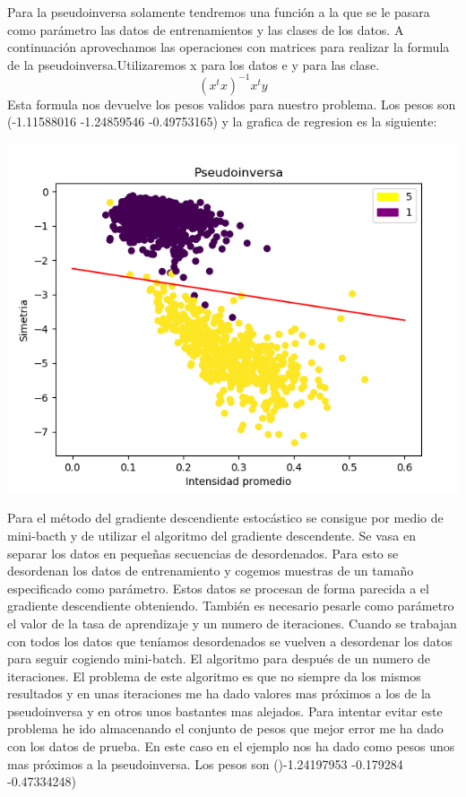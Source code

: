 \documentclass[titlepage]{article}
\begin{document}
	\normalfont
	\vspace{0.5cm}
	
	 Para la pseudoinversa solamente tendremos una función a la que se le pasara como parámetro las datos de entrenamientos y las clases de los datos. A continuación aprovechamos las operaciones con matrices para realizar la formula de la pseudoinversa.Utilizaremos x para los datos e y para las clase.
	 \begin{equation}
	  (x^tx)^{-1}x^ty
	 \end{equation}
	 Esta formula nos devuelve los pesos validos para nuestro problema.
	 Los pesos son (-1.11588016 -1.24859546 -0.49753165) y la grafica de regresion es la siguiente:
	 \begin{center}
	 	\includegraphics[scale=0.5]{pseudoinversa.png}
	 \end{center}
 
 	Para el método del gradiente descendiente estocástico se consigue por medio de mini-bacth y de utilizar el algoritmo del gradiente descendente. Se vasa en separar los datos en pequeñas secuencias de desordenados. Para esto se desordenan los datos de entrenamiento y cogemos muestras de un tamaño especificado como parámetro. Estos datos se procesan de forma parecida a el gradiente descendiente obteniendo. También es necesario pesarle como parámetro el valor de la tasa de aprendizaje y un numero de iteraciones. Cuando se trabajan con todos los datos que teníamos desordenados se vuelven a desordenar los datos para seguir cogiendo mini-batch. El algoritmo para después de un numero de iteraciones.
 	El problema de este algoritmo es que no siempre da los mismos resultados y en unas iteraciones me ha dado valores mas próximos a los de la pseudoinversa y en otros unos bastantes mas alejados. Para intentar evitar este problema he ido almacenando el conjunto de pesos que mejor error me ha dado con los datos de prueba.
	En este caso en el ejemplo nos ha dado como pesos unos mas próximos a la pseudoinversa. Los pesos son ()-1.24197953 -0.179284   -0.47334248)
	
\end{document}
